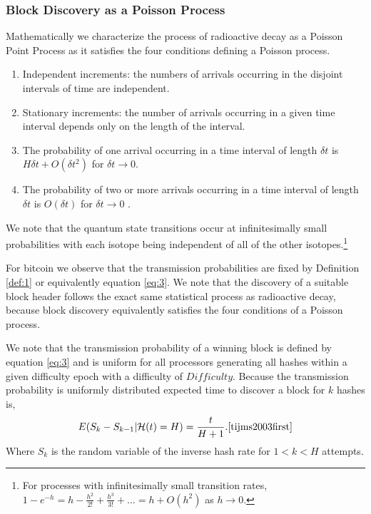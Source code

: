 \documentclass[runningheads]{llncs}
\begin{document}
\subsubsection{Block Discovery as a Poisson Process}
Mathematically we characterize the process of radioactive decay as a Poisson Point Process as it satisfies the four conditions defining a Poisson process.
\begin{enumerate}
    \item Independent increments: the numbers of arrivals occurring in the disjoint intervals of time are independent.
    \item Stationary increments: the number of arrivals occurring in a given time interval depends only on the length of the interval.
    \item The probability of one arrival occurring in a time interval of length $\delta t$ is $H \delta t + O(\delta t^2)$ for $\delta t \rightarrow 0$.
    \item The probability of two or more arrivals occurring in a time interval of length $\delta t$ is $O(\delta t)$ for $\delta t \rightarrow 0$ \cite{tijms2003first}.
\end{enumerate}
We note that the quantum state transitions occur at infinitesimally small probabilities with each isotope being independent of all of the other isotopes.\footnote{
    For processes with infinitesimally small transition rates, $1 - e^{-h} = h - \frac{h^2}{2!} + \frac{h^3}{3!} + \ldots = h + O(h^2)$ as $h \rightarrow 0$\cite{tijms2003first}.}

For bitcoin we observe that the transmission probabilities are fixed by Definition \ref{def:1} or equivalently equation \ref{eq:3}.
We note that the discovery of a suitable block header follows the exact same statistical process as radioactive decay, because block discovery equivalently satisfies the four conditions of a Poisson process.

We note that the transmission probability of a winning block is defined by equation \ref{eq:3} and is uniform for all processors generating all hashes within a given difficulty epoch with a difficulty of $Difficulty$.
Because the transmission probability is uniformly distributed expected time to discover a block for $k$ hashes is, 
\begin{equation}
    E(S_k - S_{k - 1}| \mathcal{H}(t) = H) = \frac{t}{H + 1}.\mbox{\cite{tijms2003first}}
\end{equation}
Where $S_k$ is the random variable of the inverse hash rate for $1 < k < H$ attempts.
\end{document}
